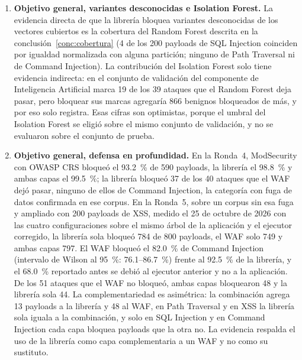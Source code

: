 \begin{enumerate}
    \item \textbf{Objetivo general, variantes desconocidas e Isolation Forest.}\label{conc:variantes}
    La evidencia directa de que la librería bloquea variantes desconocidas de los vectores cubiertos
    es la cobertura del Random Forest descrita en la conclusión~\ref{conc:cobertura} (4 de los 200 payloads de SQL
    Injection coinciden por igualdad normalizada con alguna partición; ninguno de Path Traversal ni
    de Command Injection). La contribución del Isolation Forest solo tiene evidencia indirecta: en
    el conjunto de validación del componente de Inteligencia Artificial \cite{valenzuela2026ia} marca 19 de los 39 ataques
    que el Random Forest deja pasar, pero bloquear sus marcas agregaría 866 benignos bloqueados de
    más, y por eso solo registra. Esas cifras son optimistas, porque el umbral del Isolation Forest
    se eligió sobre el mismo conjunto de validación, y no se evaluaron sobre el conjunto de prueba.

    \item \textbf{Objetivo general, defensa en profundidad.}\label{conc:waf} En la Ronda~4, ModSecurity con OWASP CRS
    bloqueó el 93.2~\% de 590 payloads, la librería el 98.8~\% y ambas capas el 99.5~\%; la librería
    bloqueó 37 de los 40 ataques que el WAF dejó pasar, ninguno de ellos de Command Injection, la
    categoría con fuga de datos confirmada en ese corpus. En la Ronda~5, sobre un corpus sin esa fuga y ampliado
    con 200 payloads de XSS, medido el 25 de octubre de 2026 con las cuatro configuraciones sobre
    el mismo árbol de la aplicación y el ejecutor corregido, la librería sola bloqueó 784 de 800
    payloads, el WAF solo 749 y ambas capas 797. El WAF bloqueó el 82.0~\% de Command Injection
    (intervalo de Wilson al 95~\%: 76.1--86.7~\%) frente al 92.5~\% de la librería, y el 68.0~\%
    reportado antes se debió al ejecutor anterior y no a la aplicación. De los 51 ataques que el WAF
    no bloqueó, ambas capas bloquearon 48 y la librería sola 44. La complementariedad es asimétrica:
    la combinación agrega 13 payloads a la librería y 48 al WAF, en Path Traversal y en XSS la
    librería sola iguala a la combinación, y solo en SQL Injection y en Command Injection cada capa
    bloquea payloads que la otra no. La evidencia respalda el uso de la librería como capa
    complementaria a un WAF y no como su sustituto.


\end{enumerate}
